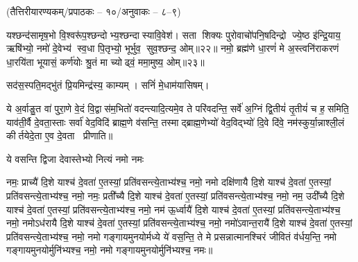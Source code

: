 {}
\newcommand{\anuvakamend}{\refstepcounter{anuvakam}\\[-0.8ex]
\rule[0.5ex]{0.93\textwidth}{1.5pt}\bfseries{[\devanumber{\arabic{anuvakam}}]}%
}
\setlength{\emergencystretch}{3em}

\clearpage

\clearpage
 
\clearpage
 
\closesection

\clearpage
 
\clearpage
 
\clearpage
{}
\centerline{\scriptsize (तैत्तिरीयारण्यकम्/प्रपाठकः – १०/अनुवाकः – ८–९)}
यश्छन्द॑सामृष॒भो वि॒श्वरू॑प॒श्छन्दोभ्य॒श्छन्दास्यावि॒वेश॑। सता शिक्यः पुरोवाचो॑पनि॒षदिन्द्रो ज्ये॒ष्ठ इ॑न्द्रि॒याय॒ ऋषि॑भ्यो॒ नमो॑ दे॒वेभ्य॑ स्व॒धा पि॒तृभ्यो॒ भूर्भुव॒ सुव॒श्छन्द॒ ओम्॥२२॥ नमो॒ ब्रह्म॑णे धा॒रणं॑ मे अ॒स्त्वनि॑राकरणं धा॒रयि॑ता भूयासं॒ कर्ण॑योः श्रु॒तं मा च्योढ्वं॒ ममा॒मुष्य॒ ओम्॥२३॥

सद॑स॒स्पति॒मद्भु॑तं प्रि॒यमिन्द्र॑स्य॒ काम्यम्। सनिं॑ मे॒धाम॑यासिषम्।
\closesection

ये अ॒र्वाङु॒त वा॑ पुरा॒णे वे॒दं वि॒द्वास॑म॒भितो॑ वदन्त्यादि॒त्यमे॒व ते परि॑वदन्ति॒ सर्वे॑ अ॒ग्निं द्वि॒तीयं॑ तृ॒तीयं॑ च ह॒समिति॒ याव॑ती॒र्वै दे॒वता॒स्ताः सर्वा॑ वेद॒विदि॑ ब्राह्म॒णे व॑सन्ति॒ तस्माद्ब्राह्म॒णेभ्यो॑ वेद॒विद्भ्यो॑ दि॒वे दि॑वे॒ नम॑स्कुर्या॒न्नाश्ली॒लं कीर्तयेदे॒ता ए॒व दे॒वता प्रीणाति॥

{ये वसन्ति द्विजा देवास्तेभ्यो नित्यं नमो नमः}


नमः॒ प्राच्यै॑ दि॒शे याश्च॑ दे॒वता॑ ए॒तस्यां॒ प्रति॑वसन्त्ये॒ताभ्य॑श्च॒  नमो॒ नमो दक्षि॑णायै दि॒शे याश्च॑ दे॒वता॑ ए॒तस्यां॒ प्रति॑वसन्त्ये॒ताभ्य॑श्च॒  नमो॒ नमः॒ प्रती᳚च्यै दि॒शे याश्च॑ दे॒वता॑ ए॒तस्यां॒ प्रति॑वसन्त्ये॒ताभ्य॑श्च॒  नमो॒ नम॒ उदी᳚च्यै दि॒शे याश्च॑ दे॒वता॑ ए॒तस्यां॒ प्रति॑वसन्त्ये॒ताभ्य॑श्च॒  नमो॒ नम॑ ऊ॒र्ध्वायै॑ दि॒शे याश्च॑ दे॒वता॑ ए॒तस्यां॒ प्रति॑वसन्त्ये॒ताभ्य॑श्च॒  नमो॒ नमोऽध॑रायै दि॒शे याश्च॑ दे॒वता॑ ए॒तस्यां॒ प्रति॑वसन्त्ये॒ताभ्य॑श्च॒  नमो॒ नमो॑ऽवान्त॒रायै॑ दि॒शे याश्च॑ दे॒वता॑ ए॒तस्यां॒ प्रति॑वसन्त्ये॒ताभ्य॑श्च॒  नमो॒ नमो गङ्गायमुनयोर्मध्ये ये॑ वस॒न्ति॒ ते मे प्रसन्नात्मानश्चिरं जीवितं व॑र्धय॒न्ति॒ नमो गङ्गायमुनयोर्मुनि॑भ्यश्च॒ नमो॒ नमो गङ्गायमुनयोर्मुनि॑भ्यश्च॒ नमः॥

